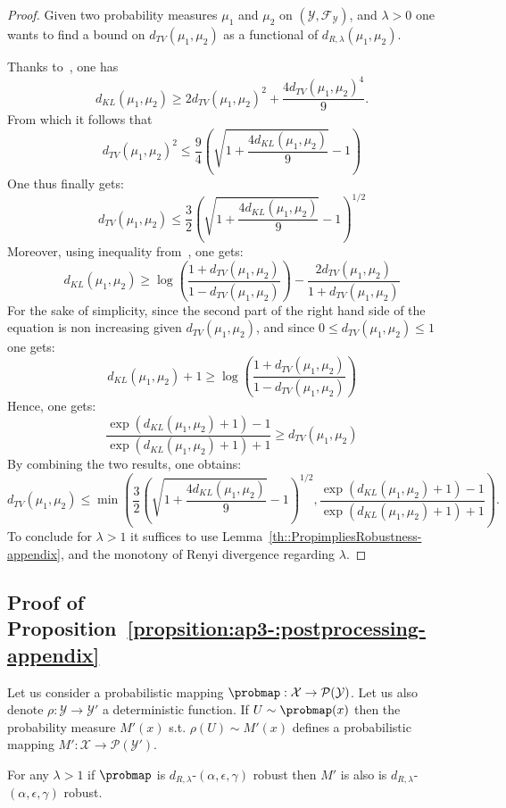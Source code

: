 \begin{proof}
Given two probability measures $\mu_1$ and $\mu_2$ on $(\mathcal{Y},\mathcal{F}_{\mathcal{Y}})$, and $\lambda >0$ one wants to find a bound on $d_{TV}(\mu_1,\mu_2)$ as a functional of $d_{R,\lambda}(\mu_1,\mu_2)$. 

Thanks to~\cite{5605338}, one has $$ d_{KL}(\mu_1,\mu_2) \geq 2d_{TV}(\mu_1,\mu_2)^{2}+ \frac{4d_{TV}(\mu_1,\mu_2)^{4}}{9}. $$ From which it follows that $$d_{TV}(\mu_1,\mu_2)^{2} \leq \frac{9}{4}\left(\sqrt{1 + \frac{4d_{KL}(\mu_1,\mu_2)}{9}} - 1\right)$$
One thus finally gets: 
$$d_{TV}(\mu_1,\mu_2) \leq \frac{3}{2}\left(\sqrt{1 + \frac{4d_{KL}(\mu_1,\mu_2)}{9}} - 1\right)^{1/2}$$
Moreover, using inequality from~\cite{Vajda1970}, one gets:
$$d_{KL}(\mu_1,\mu_2) \geq \log\left(\frac{1 + d_{TV}(\mu_1,\mu_2)}{1 - d_{TV}(\mu_1,\mu_2)} \right) - \frac{2d_{TV}(\mu_1,\mu_2)}{1 + d_{TV}(\mu_1,\mu_2)}$$
For the sake of simplicity, since the second part of the right hand side of the equation is non increasing given $d_{TV}(\mu_1,\mu_2)$, and since $0\leq d_{TV}(\mu_1,\mu_2)\leq 1$  one gets:
$$d_{KL}(\mu_1,\mu_2) +1 \geq \log\left(\frac{1 + d_{TV}(\mu_1,\mu_2)}{1 - d_{TV}(\mu_1,\mu_2)} \right) $$
Hence, one gets:
$$ \frac{\exp(d_{KL}(\mu_1,\mu_2) +1) -1}{\exp(d_{KL}(\mu_1,\mu_2) +1) +1} \geq  d_{TV}(\mu_1,\mu_2) $$
By combining the two results, one obtains: $$ d_{TV}(\mu_1,\mu_2) \leq \min \left(\frac{3}{2}\left(\sqrt{1 + \frac{4 d_{KL}(\mu_1,\mu_2)}{9}} - 1\right)^{1/2}, \frac{\exp(d_{KL}(\mu_1,\mu_2) +1) -1}{\exp(d_{KL}(\mu_1,\mu_2) +1) +1} \right).$$
To conclude for $\lambda>1$ it suffices to use Lemma~\ref{th::PropimpliesRobustness-appendix}, and the monotony of Renyi divergence regarding $\lambda$.
\end{proof}

\subsection{Proof of Proposition~\ref{propsition:ap3-:postprocessing-appendix}}


\begin{proposition}
\label{propsition:ap3-:postprocessing-appendix} 
Let us consider a probabilistic mapping $\probmap:\mathcal{X}\rightarrow\mathcal{P}(\mathcal{Y})$. Let us also denote $\rho:\mathcal{Y}\rightarrow\mathcal{Y}'$ a deterministic function.
If $U\sim \probmap(x)$ then the probability measure $M'(x)$ s.t. $\rho(U) \sim M'(x)$ defines a probabilistic mapping $M':\mathcal{X}\rightarrow\mathcal{P}(\mathcal{Y}')$.

For any $\lambda>1$ if $\probmap$ is $d_{R,\lambda}$-$(\alpha,\epsilon,\gamma)$ robust then $M'$ is also is $d_{R,\lambda}$-$(\alpha,\epsilon,\gamma)$ robust.
\end{proposition}

